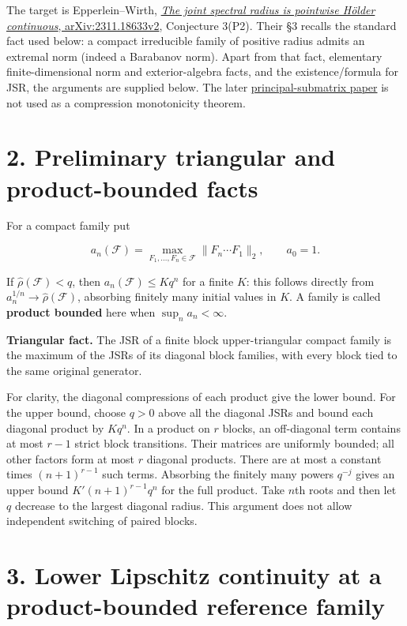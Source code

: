 \documentclass[11pt,a4paper]{article}
\begin{document}
The target is Epperlein--Wirth, \href{https://arxiv.org/html/2311.18633v2}{\emph{The joint spectral radius is pointwise Hölder continuous}, arXiv:2311.18633v2}, Conjecture 3(P2). Their \S{}3 recalls the standard fact used below: a compact irreducible family of positive radius admits an extremal norm (indeed a Barabanov norm). Apart from that fact, elementary finite-dimensional norm and exterior-algebra facts, and the existence/formula for JSR, the arguments are supplied below. The later \href{https://arxiv.org/html/2504.17505v1}{principal-submatrix paper} is not used as a compression monotonicity theorem.

\section{2. Preliminary triangular and product-bounded facts}\label{preliminary-triangular-and-product-bounded-facts}

For a compact family put

\[
a_n(\mathcal F)=\max_{F_1,\ldots,F_n\in\mathcal F}\|F_n\cdots F_1\|_2,
\qquad a_0=1.
\]

If \(\widehat\rho(\mathcal F)<q\), then \(a_n(\mathcal F)\le Kq^n\) for a finite \(K\): this follows directly from \(a_n^{1/n}\to\widehat\rho(\mathcal F)\), absorbing finitely many initial values in \(K\). A family is called \textbf{product bounded} here when \(\sup_n a_n<\infty\).

\textbf{Triangular fact.} The JSR of a finite block upper-triangular compact family is the maximum of the JSRs of its diagonal block families, with every block tied to the same original generator.

For clarity, the diagonal compressions of each product give the lower bound. For the upper bound, choose \(q>0\) above all the diagonal JSRs and bound each diagonal product by \(Kq^n\). In a product on \(r\) blocks, an off-diagonal term contains at most \(r-1\) strict block transitions. Their matrices are uniformly bounded; all other factors form at most \(r\) diagonal products. There are at most a constant times \((n+1)^{r-1}\) such terms. Absorbing the finitely many powers \(q^{-j}\) gives an upper bound \(K'(n+1)^{r-1}q^n\) for the full product. Take \(n\)th roots and then let \(q\) decrease to the largest diagonal radius. This argument does not allow independent switching of paired blocks.

\section{3. Lower Lipschitz continuity at a product-bounded reference family}\label{lower-lipschitz-continuity-at-a-product-bounded-reference-family}
\end{document}
